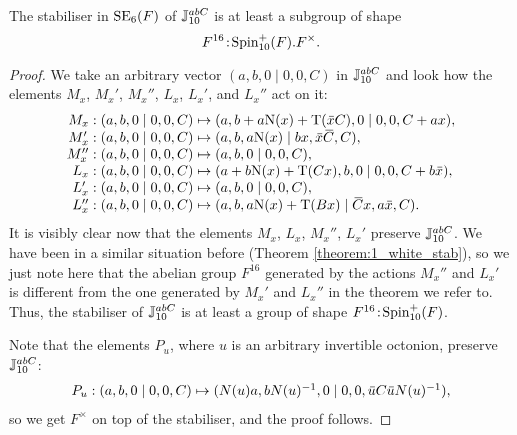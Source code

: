 \begin{lemma}
	The stabiliser in $\mathrm{SE}_6(F)$ of $\mathbb{J}_{10}^{abC}$ is at least
	a subgroup of shape 
	\begin{equation}
		F^{16}\mathord{{\;\!{:}\;\!}}\mathrm{Spin}_{10}^+(F).F^{\times}.
	\end{equation}
\end{lemma}

\begin{proof}
	We take an arbitrary vector $(a,b,0 \mid 0,0,C)$ in 
	$\mathbb{J}_{10}^{abC}$ and look how the elements $M_x$, $M_x'$,
	$M_x''$, $L_x$, $L_x'$, and $L_x''$ act on it:
	\begin{equation*}
		\begin{array}{r@{\;}c@{\;}l}
			M_x: (a,b,0\mid 0,0,C) & \mapsto & 
				(a, b + a\NN(x) + \Tr(\ovx C), 0 \mid
					0,0, C + a x), \\
			
			M_x': (a,b,0\mid 0,0,C) & \mapsto & 
				(a, b, a \NN(x) \mid b x, \ovx \ovC, C), \\
				
			M_x'': (a,b,0 \mid 0,0,C) & \mapsto & 
				(a, b, 0 \mid 0, 0, C), \\
				
			L_x: (a,b,0 \mid 0,0,C) & \mapsto & 
				(a + b\NN(x) + \Tr(Cx), b, 0 \mid
					0, 0, C + b\ovx), \\
					
			L_x': (a,b,0 \mid 0,0,C) & \mapsto & 
				(a, b, 0 \mid 0,0,C), \\
				
			L_x'': (a,b,0 \mid 0,0,C) & \mapsto & 
				(a, b, a\NN(x) + \Tr(B x) \mid
					\ovC x, a\ovx, C).
		\end{array}
	\end{equation*}
	It is visibly clear now that the elements $M_x$, $L_x$,
	$M_x''$, $L_x'$ preserve $\mathbb{J}_{10}^{abC}$. We have been in 
	a similar situation before 
	(Theorem \ref{theorem:1_white_stab}), so we just note here
	that the abelian group $F^{16}$ generated by the actions
	$M_x''$ and $L_x'$ is different from the one generated by
	$M_x'$ and $L_x''$ in the theorem we refer to. Thus, 
	the stabiliser of $\mathbb{J}_{10}^{abC}$ is at least a group of
	shape $F^{16}\mathord{{\;\!{:}\;\!}}\mathrm{Spin}_{10}^+(F)$. 
	
	Note that the elements $P_u$, where $u$ is an arbitrary
	invertible octonion, preserve $\mathbb{J}_{10}^{abC}$:
	\begin{equation*}
		\begin{array}{r@{\;}c@{\;}l}
			P_u: (a,b,0\mid 0,0,C) & \mapsto &
		(N(u)a, b N(u)^{-1}, 0 \mid 0,0, \ovu C \ovu N(u)^{-1}),
		\end{array}
	\end{equation*}
	so we get $F^{\times}$ on top of the stabiliser, 
	and the proof follows.
\end{proof}







